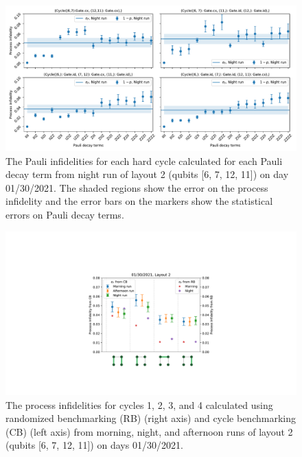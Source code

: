 \begin{figure}[htpb]
    \includegraphics[scale=0.56]{CBPauliInfidelities_30_01_2021_NightRun_Layout2_Cycle1_2_3_4.pdf}
    \caption{The Pauli infidelities for each hard cycle calculated for each Pauli decay term from night run of layout 2 (qubits [6, 7, 12, 11]) on day 01/30/2021. The shaded regions show the error on the process infidelity and the error bars on the markers show the statistical errors on Pauli decay terms. }
    \label{fig:PauliInfidelities30Night_Story7}
\end{figure}



\begin{figure}[htpb]
    \includegraphics[scale=0.5]{ProcessInfidelitiesCB_RB_plots_30_morning_afternoon_night_L2.pdf}
    \caption{The process infidelities for cycles  1, 2, 3, and 4 calculated using randomized benchmarking (RB) (right axis) and cycle benchmarking (CB) (left axis) from morning, night, and afternoon runs of layout 2 (qubits [6, 7, 12, 11]) on days 01/30/2021.}
    \label{fig:processinfidelitiesStory7}
\end{figure}


